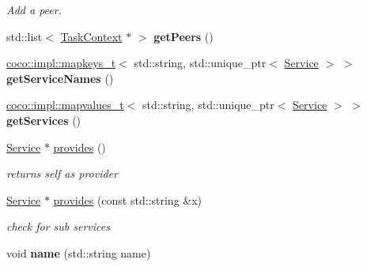 \begin{DoxyCompactItemize}
\begin{DoxyCompactList}\small\item\em Add a peer. \end{DoxyCompactList}\item 
\hypertarget{classcoco_1_1_service_aa02f55a16b0446ea2a3c3e7fa163da2e}{}std\+::list$<$ \hyperlink{classcoco_1_1_task_context}{Task\+Context} $\ast$ $>$ {\bfseries get\+Peers} ()\label{classcoco_1_1_service_aa02f55a16b0446ea2a3c3e7fa163da2e}

\item 
\hypertarget{classcoco_1_1_service_a695926c6b3382655d520fd03a4faf782}{}\hyperlink{structcoco_1_1impl_1_1mapkeys__t}{coco\+::impl\+::mapkeys\+\_\+t}$<$ std\+::string, std\+::unique\+\_\+ptr$<$ \hyperlink{classcoco_1_1_service}{Service} $>$ $>$ {\bfseries get\+Service\+Names} ()\label{classcoco_1_1_service_a695926c6b3382655d520fd03a4faf782}

\item 
\hypertarget{classcoco_1_1_service_af1327107655a40e8b2000171b6ca600d}{}\hyperlink{structcoco_1_1impl_1_1mapvalues__t}{coco\+::impl\+::mapvalues\+\_\+t}$<$ std\+::string, std\+::unique\+\_\+ptr$<$ \hyperlink{classcoco_1_1_service}{Service} $>$ $>$ {\bfseries get\+Services} ()\label{classcoco_1_1_service_af1327107655a40e8b2000171b6ca600d}

\item 
\hypertarget{classcoco_1_1_service_ad73c4cdd616d7308174c9b40bf69489c}{}\hyperlink{classcoco_1_1_service}{Service} $\ast$ \hyperlink{classcoco_1_1_service_ad73c4cdd616d7308174c9b40bf69489c}{provides} ()\label{classcoco_1_1_service_ad73c4cdd616d7308174c9b40bf69489c}

\begin{DoxyCompactList}\small\item\em returns self as provider \end{DoxyCompactList}\item 
\hypertarget{classcoco_1_1_service_ae34998ed39c71b711e9d1939472a85b1}{}\hyperlink{classcoco_1_1_service}{Service} $\ast$ \hyperlink{classcoco_1_1_service_ae34998ed39c71b711e9d1939472a85b1}{provides} (const std\+::string \&x)\label{classcoco_1_1_service_ae34998ed39c71b711e9d1939472a85b1}

\begin{DoxyCompactList}\small\item\em check for sub services \end{DoxyCompactList}\item 
\hypertarget{classcoco_1_1_service_a746f82c2977e9e8d3c39012d60712318}{}void {\bfseries name} (std\+::string name)\label{classcoco_1_1_service_a746f82c2977e9e8d3c39012d60712318}


\end{DoxyCompactItemize}
